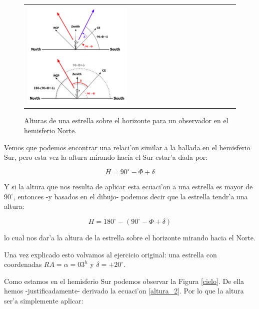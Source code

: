 \documentclass{article}
\begin{document}
\begin{enumerate}[a)]
\begin{enumerate} [i)]
\begin{figure}[!ht]
\begin{center}
\begin{tabular}{ll}
  \includegraphics[width=0.5\textwidth]{altura_2.png} 
\end{tabular}
\caption{{\small Alturas de una estrella sobre el horizonte para un observador en el hemisferio Norte.}}\label{cielo_2}
\end{center} 
\end{figure}

Vemos que podemos encontrar una relaci'on similar a la hallada en el hemisferio Sur, pero esta vez la altura mirando hacia el Sur estar'a dada por:

\begin{equation} \label{altura_norte}
H = 90^\circ - \Phi + \delta
\end{equation}

Y si la altura que nos resulta de aplicar esta ecuaci'on a una estrella es mayor de $90^\circ$, entonces -y basados en el dibujo- podemos decir que la estrella tendr'a una altura:

\begin{equation} \label{altura_norte_2}
H = 180^\circ - (90^\circ - \Phi + \delta)
\end{equation}

lo cual nos dar'a la altura de la estrella sobre el horizonte mirando hacia el Norte.

\vspace{3mm}


Una vez explicado esto volvamos al ejercicio original: una estrella con coordenadas $RA = \alpha = 03^h$ y $\delta = +20^\circ$.

Como estamos en el hemisferio Sur podemos observar la Figura \ref{cielo}. De ella hemos -justificadamente- derivado la ecuaci'on \eqref{altura_2}. Por lo que la altura ser'a simplemente aplicar:


\end{enumerate}
\end{enumerate}
\end{document}

